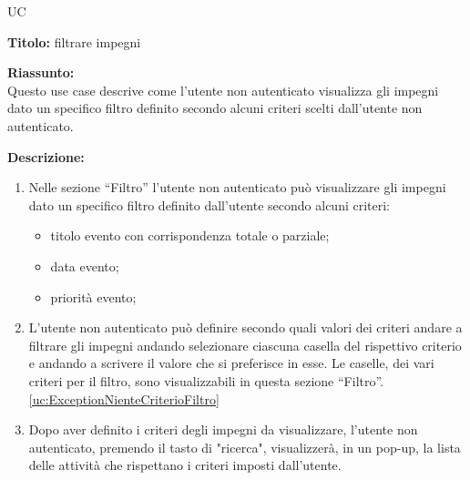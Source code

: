\begin{listaPersonale}{UC}
    \newpage


    \begin{center}
        
    \end{center}
    \begin{listaPersonale2}[UC] {}
            \textbf{Titolo:} filtrare impegni

            \textbf{Riassunto:} \\
            Questo use case descrive come l'utente non autenticato visualizza gli impegni dato un specifico filtro definito secondo alcuni criteri scelti dall'utente non autenticato.

            \textbf{Descrizione:}
            \begin{enumerate}
                \item Nelle sezione “Filtro” l'utente non autenticato può visualizzare gli impegni dato un specifico filtro definito dall'utente secondo alcuni criteri:
                      \begin{itemize}
                          \item titolo evento con corrispondenza totale o parziale;
                          \item data evento;
                          \item priorità evento;
                      \end{itemize}

                \item L'utente non autenticato può definire secondo quali valori dei criteri andare a filtrare gli impegni andando selezionare ciascuna casella del rispettivo criterio e andando a scrivere il valore che si preferisce in esse. Le caselle, dei vari criteri per il filtro, sono visualizzabili in questa sezione “Filtro”. \ref{uc:ExceptionNienteCriterioFiltro}
                \item Dopo aver definito i criteri degli impegni da visualizzare, l'utente non autenticato, premendo il tasto di "ricerca", visualizzerà, in un pop-up, la lista delle attività che rispettano i criteri imposti dall'utente.
            \end{enumerate}


\end{listaPersonale2}
\end{listaPersonale}
